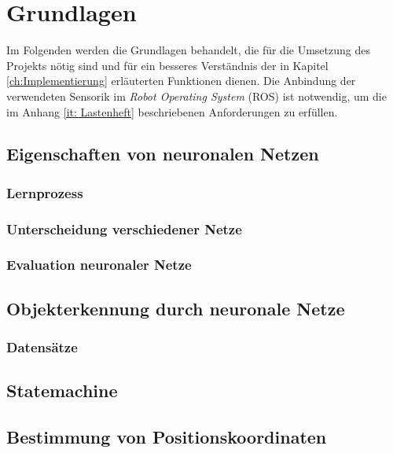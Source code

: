 \chapter{Grundlagen}
\label{ch: Grundlagen}
	
	Im Folgenden werden die Grundlagen behandelt, die für die Umsetzung des Projekts nötig sind und für ein besseres Verständnis der in Kapitel \ref{ch:Implementierung} erläuterten Funktionen dienen.	Die Anbindung der verwendeten Sensorik im \textit{Robot Operating System} (ROS) ist notwendig, um die im Anhang \ref{it: Lastenheft} beschriebenen Anforderungen zu erfüllen. 
	
 	\section{Eigenschaften von neuronalen Netzen}
	\label{sec: ROS}
	
		\subsection{Lernprozess}
		
		\subsection{Unterscheidung verschiedener Netze}
		
		\subsection{Evaluation neuronaler Netze}
		
		
	\section{Objekterkennung durch neuronale Netze}
	\label{sec: Mecanumräder}
		
		\subsection{Datensätze}
		
	

			
	\section{Statemachine}
	\label{sec: Regelung}
	
	
		
		
	\section{Bestimmung von Positionskoordinaten}
	
	

